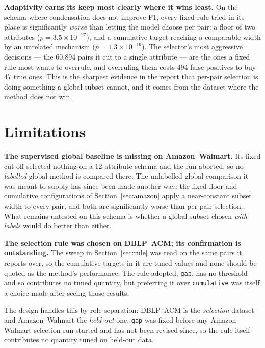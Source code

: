 \documentclass[11pt]{article}
\begin{document}
\textbf{Adaptivity earns its keep most clearly where it wins least.} On the schema where
condensation does not improve F1, every fixed rule tried in its place is significantly
\emph{worse} than letting the model choose per pair: a floor of two attributes
($p = 3.5\times10^{-27}$), and a cumulative target reaching a comparable width by an
unrelated mechanism ($p = 1.3\times10^{-19}$). The selector's most aggressive decisions ---
the 60{,}894 pairs it cut to a single attribute --- are the ones a fixed rule most wants to
overrule, and overruling them costs 494 false positives to buy 47 true ones. This is the
sharpest evidence in the report that per-pair selection is doing something a global subset
cannot, and it comes from the dataset where the method does not win.

\section{Limitations}

\textbf{The supervised global baseline is missing on Amazon--Walmart.} Its fixed cut-off
selected nothing on a 12-attribute schema and the run aborted, so no \emph{labelled} global
method is compared there. The unlabelled global comparison it was meant to supply has since
been made another way: the fixed-floor and cumulative configurations of
Section~\ref{sec:amazon} apply a near-constant subset width to every pair, and both are
significantly worse than per-pair selection. What remains untested on this schema is whether
a global subset chosen \emph{with labels} would do better than either.

\textbf{The selection rule was chosen on DBLP--ACM; its confirmation is outstanding.} The
sweep in Section~\ref{sec:rule} was read on the same pairs it reports over, so the
cumulative targets in it are tuned values and none should be quoted as the method's
performance. The rule adopted, \texttt{gap}, has no threshold and so contributes no tuned
quantity, but preferring it over \texttt{cumulative} was itself a choice made after seeing
those results.

The design handles this by role separation: DBLP--ACM is the \emph{selection} dataset and
Amazon--Walmart the \emph{held-out} one. \texttt{gap} was fixed before any Amazon--Walmart
selection run started and has not been revised since, so the rule itself contributes no
quantity tuned on held-out data.
\end{document}
